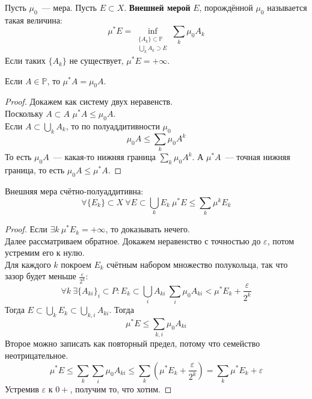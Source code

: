 \documentclass{article}
\let\eps\varepsilon
\begin{document}
    \begin{definition}
        Пусть $\mu_0$~--- мера. Пусть $E\subset X$. \textbf{Внешней мерой} $E$, порождённой $\mu_0$ называется такая величина:
        $$\mu^*E=\inf\limits_{\substack{\{A_k\}\subset\mathbb P\\\bigcup\limits_kA_k\supset E}}\sum\limits_k\mu_0A_k$$
        Если таких $\{A_k\}$ не существует, $\mu^*E=+\infty$.
    \end{definition}
    \begin{property}
        Если $A\in\mathbb P$, то $\mu^*A=\mu_0A$.
    \end{property}
    \begin{proof}
        Докажем как систему двух неравенств.\\
        Поскольку $A\subset A$ $\mu^*A\leqslant\mu_0A$.\\
        Если $A\subset\bigcup\limits_kA_k$, то по полуаддитивности $\mu_0$
        $$
        \mu_0A\leqslant\sum\limits_k\mu_0A^k
        $$
        То есть $\mu_0A$~--- какая-то нижняя граница $\sum\limits_k\mu_0A^k$. А $\mu^*A$~--- точная нижняя граница, то есть $\mu_0A\leqslant\mu^*A$.
    \end{proof}
    \begin{property}
        Внешняя мера счётно-полуаддитивна:
        $$
        \forall\{E_k\}\subset X~\forall E\subset\bigcup\limits_kE_k~\mu^*E\leqslant\sum\limits_k\mu^kE_k
        $$
    \end{property}
    \begin{proof}
        Если $\exists k~\mu^* E_k=+\infty$, то доказывать нечего.\\
        Далее рассматриваем обратное. Докажем неравенство с точностью до $\varepsilon$, потом устремим его к нулю.\\
        Для каждого $k$ покроем $E_k$ счётным набором множество полукольца, так что зазор будет меньше $\frac\eps{2^k}$:
        $$
        \forall k~\exists\{A_{ki}\}_i\subset P:E_k\subset\bigcup\limits_iA_{ki}~\sum\limits_i\mu_0A_{ki}<\mu^*E_k+\frac\eps{2^k}
        $$
        Тогда $E\subset\bigcup\limits_kE_k\subset\bigcup\limits_{k,i}A_{ki}$. Тогда
        $$
        \mu^*E\leqslant\sum\limits_{k,i}\mu_0A_{ki}
        $$
        Второе можно записать как повторный предел, потому что семейство неотрицательное.
        $$
        \mu^*E\leqslant\sum\limits_k\sum\limits_i\mu_0A_{ki}\leqslant\sum\limits_k\left(\mu^*E_k+\frac\eps{2^k}\right)=\sum\limits_k\mu^*E_k+\eps
        $$
        Устремив $\eps$ к $0+$, получим то, что хотим.
    \end{proof}
\end{document}

